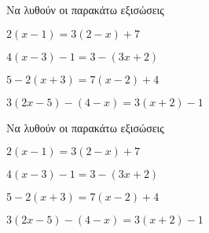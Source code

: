 Να λυθούν οι παρακάτω εξισώσεις
\begin{rlist}
\item $ 2(x-1)=3(2-x)+7 $
\item $ 4(x-3)-1=3-(3x+2) $
\item $ 5-2(x+3)=7(x-2)+4 $
\item $ 3(2x-5)-(4-x)=3(x+2)-1 $
\end{rlist}
Να λυθούν οι παρακάτω εξισώσεις
\begin{rlist}
\item $ 2(x-1)=3(2-x)+7 $
\item $ 4(x-3)-1=3-(3x+2) $
\item $ 5-2(x+3)=7(x-2)+4 $
\item $ 3(2x-5)-(4-x)=3(x+2)-1 $
\end{rlist}
